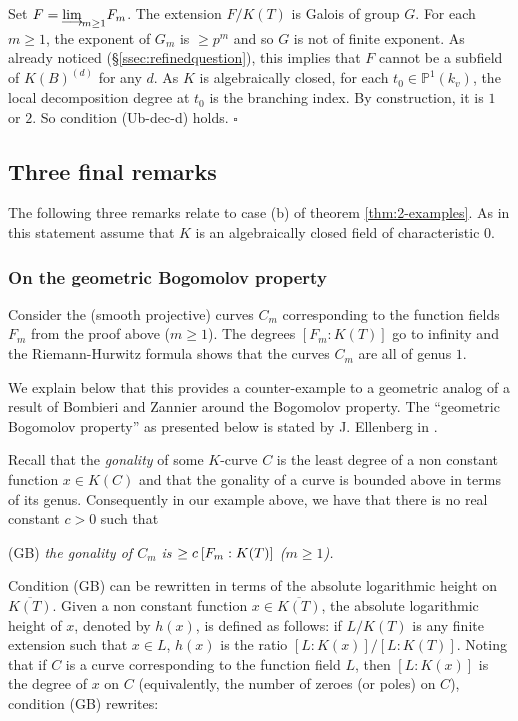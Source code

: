 \documentclass[12pt,english]{amsart}
\newtheorem{twisting lemma}[theorem]{Twisting lemma}
\begin{document}
Set $F={\mathop{\oalign{lim\cr
\hidewidth$\longrightarrow$\hidewidth\cr}}}_{m\geq 1} F_m$. The extension $F/K(T)$ is Galois of group $G$. 
For each $m\geq 1$, the exponent of $G_m$ is $\geq p^m$ and so $G$ is not of
finite exponent. As already noticed (\S  \ref{ssec:refinedquestion}), this implies that $F$ cannot be a subfield of $K(B)^{(d)}$ for any $d$.
As $K$ is algebraically closed,  for each $t_0\in {\mathbb{P}}^1(k_v)$, the {local decomposition degree} at  $t_0$ is the branching index. By construction, it is $1$ or $2$. So condition {\rm (Ub-dec-d)} holds. $\square$

\subsection{Three final remarks}

The following three remarks relate to case (b) of theorem \ref{thm:2-examples}. 
As in this statement assume that $K$ is an algebraically closed field of characteristic $0$.

\subsubsection{On the geometric Bogomolov property} \label{sec:bogomolov} 
Consider the (smooth pro\-jective) curves $C_m$ corresponding to the function fields $F_m$ from the proof above ($m\geq 1$). The degrees $[F_m:K(T)]$ go to infinity and the Riemann-Hurwitz formula shows that the curves $C_m$ are all of genus $1$. 

We explain below that this provides a counter-example to a geometric analog of a result of Bombieri and Zannier around the Bogomolov property. The ``geometric Bogomolov property'' as presented below is stated by J. Ellenberg in \cite{Eblog}.

Recall that the \emph{gonality} of some $K$-curve $C$ is the least degree of a non constant function $x\in K(C)$ and that  the gonality of a curve is bounded above in terms of its genus. Consequently in our example above, we have that there is no real constant $c>0$ such that
\vskip 2mm

\noindent
{\rm (GB)}  {\it the gonality of $C_m$ is $\geq c\hskip 2pt [F_m:K(T)]$ ($m\geq 1$).}

\vskip 2mm

Condition (GB) can be rewritten in terms of the absolute logarithmic height on $\overline{K(T)}$. Given a non constant function $x\in \overline{K(T)}$, the absolute logarithmic height of $x$, denoted by $h(x)$, is defined as follows:  if $L/K(T)$ is any finite extension such that $x\in L$, $h(x)$ is the ratio $[L:K(x)]/[L:K(T)]$. Noting that if $C$ is a curve corresponding to the function field $L$, then $[L:K(x)]$ is the degree of $x$ on $C$ (equivalently, the number of zeroes (or poles) on $C$), condition (GB) rewrites:
\vskip 2mm
\end{document}
